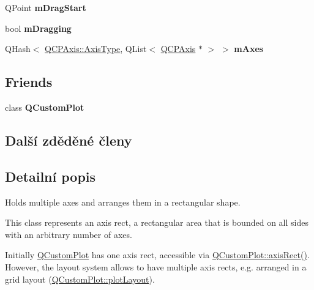 \begin{DoxyCompactItemize}
\item 
\hypertarget{classQCPAxisRect_a032896b28f83a58010d8d533b78c49df}{}Q\+Point {\bfseries m\+Drag\+Start}\label{classQCPAxisRect_a032896b28f83a58010d8d533b78c49df}

\item 
\hypertarget{classQCPAxisRect_ab49a6698194cf0e9e38a1d734c0888a8}{}bool {\bfseries m\+Dragging}\label{classQCPAxisRect_ab49a6698194cf0e9e38a1d734c0888a8}

\item 
\hypertarget{classQCPAxisRect_afe7a24d2a2bea98fc552fa826350ba81}{}Q\+Hash$<$ \hyperlink{classQCPAxis_ae2bcc1728b382f10f064612b368bc18a}{Q\+C\+P\+Axis\+::\+Axis\+Type}, Q\+List$<$ \hyperlink{classQCPAxis}{Q\+C\+P\+Axis} $\ast$ $>$ $>$ {\bfseries m\+Axes}\label{classQCPAxisRect_afe7a24d2a2bea98fc552fa826350ba81}

\end{DoxyCompactItemize}
\subsection*{Friends}
\begin{DoxyCompactItemize}
\item 
\hypertarget{classQCPAxisRect_a1cdf9df76adcfae45261690aa0ca2198}{}class {\bfseries Q\+Custom\+Plot}\label{classQCPAxisRect_a1cdf9df76adcfae45261690aa0ca2198}

\end{DoxyCompactItemize}
\subsection*{Další zděděné členy}


\subsection{Detailní popis}
Holds multiple axes and arranges them in a rectangular shape. 

This class represents an axis rect, a rectangular area that is bounded on all sides with an arbitrary number of axes.

Initially \hyperlink{classQCustomPlot}{Q\+Custom\+Plot} has one axis rect, accessible via \hyperlink{classQCustomPlot_a4a37a1add5fe63060ac518cf0a4c4050}{Q\+Custom\+Plot\+::axis\+Rect()}. However, the layout system allows to have multiple axis rects, e.\+g. arranged in a grid layout (\hyperlink{classQCustomPlot_afd280d4d621ae64a106543a545c508d7}{Q\+Custom\+Plot\+::plot\+Layout}).

